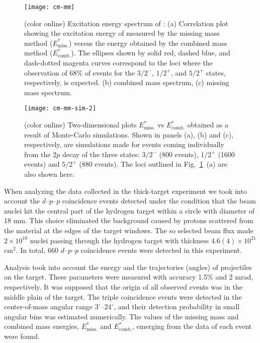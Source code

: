 \documentclass[superscriptaddress,showpacs,showkeys,twoside,floatfix,twocolumn]
{revtex4-1}
\begin{document}
\begin{figure}[t]
  \begin{center}
    \texttt{[image: cm-mm]}
  \end{center}
  \caption{\label{fig:thk-2p-hits} (color online)
    Excitation energy spectrum of :
    (a) Correlation plot showing the excitation energy of 
    measured by the missing mass method (\(E^*_{\mathrm{miss.}}\))
    versus the energy obtained by the combined mass method (\(E^*_{\mathrm{comb.}}\)).
    The ellipses shown by solid red, dashed blue, and dash-dotted magenta curves
    correspond to the loci where the observation of $68\%$ of events
    for the $3/2^-$, $1/2^+$, and $5/2^+$ states, respectively, is expected.
    (b) combined mass spectrum,
    (c) missing mass spectrum.}
\end{figure}
\begin{figure}[b]
  \begin{center}
    \texttt{[image: cm-mm-sim-2]}
  \end{center}
  \caption{\label{fig:thk-2p-hits-sim} (color online)
    Two-dimensional plots $E^*_\mathrm{miss.}$ vs $E^*_\mathrm{comb.}$ obtained
    as a result of Monte-Carlo simulations.
    Shown in panels (a), (b) and (c), respectively, are simulations made for
    events coming individually from the $2p$ decay of
    the three \isotope[17][Ne] states:
    $3/2^-$ (800 events), $1/2^+$ (1600 events) and $5/2^+$ (880 events).
    The loci outlined in Fig.~\ref{fig:thk-2p-hits}~(a) are also shown here.}
\end{figure}


When analyzing the data collected in the thick-target experiment we took into account
the \(d–p–p\) coincidence events detected under the condition that the 
beam nuclei hit the central part of the hydrogen target within a circle with diameter of 18 mm.
This choice eliminated the background caused by protons scattered from the material
at the edges of the target windows.
The so selected beam flux made $2\times 10^{10}$  nuclei
passing through the hydrogen target with thickness \(4.6(4)\times 10^{21}\) cm$^2$.
In total, 660 $d–p–p$ coincidence events were detected in this experiment.

Analysis took into account the energy and the trajectories (angles) of
 projectiles on the target.
These parameters were measured with accuracy 1.5\% and 2 mrad, respectively.
It was supposed that the origin of all observed events was in the middle plain of the target.
The triple coincidence events were detected in the center-of-mass angular range $3^\circ – 24^\circ$,
and their detection probability in small angular bins was estimated numerically.
The values of the missing mass and combined mass energies, $E^*_\mathrm{miss.}$ and
$E^*_\mathrm{comb.}$, emerging from the data of each event were found.
\end{document}
